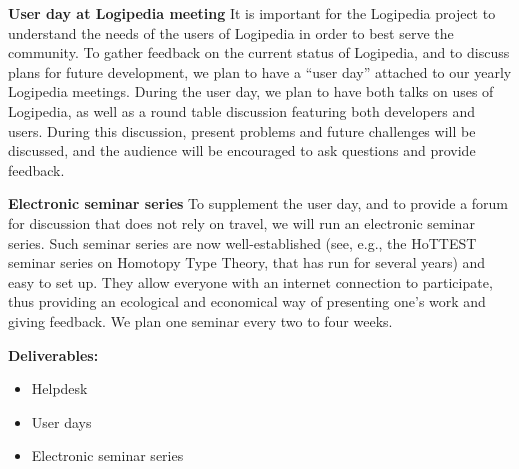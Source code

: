 \begin{workpackage}[id=dissemination,wphases=0-48,type=MGT,
  short=Dissemination,%
  title={Dissemination, communication and exploitation},
  lead=Inr]
\begin{tasklist}
\begin{task}[id=research-club,
      title=Expanding the use of Logipedia in research,
      lead=Bir,BirRM=2]
\begin{compactenum}
     \item [\textbf{User day at Logipedia meeting}]
     It is important for the Logipedia project to understand the needs of the users of Logipedia in order to best serve the community.
     To gather feedback on the current status of Logipedia, and to discuss plans for future development, we plan to have a ``user day'' attached to our yearly Logipedia meetings. 
     During the user day, we plan to have both talks on uses of Logipedia, as well as a round table discussion featuring both developers and users.
     During this discussion, present problems and future challenges will be discussed, and the audience will be encouraged to ask questions and provide feedback.
     \item [\textbf{Electronic seminar series}]
     To supplement the user day, and to provide a forum for discussion that does not rely on travel, we will run an electronic seminar series.
     Such seminar series are now well-established (see, e.g., the HoTTEST seminar series on Homotopy Type Theory, that has run for several years) and easy to set up. They allow everyone with an internet connection to participate, thus providing an ecological and economical way of presenting one's work and giving feedback. We plan one seminar every two to four weeks.
    \end{compactenum}

    \textbf{Deliverables:}
    \begin{itemize}
     \item Helpdesk
     \item User days
     \item Electronic seminar series
    \end{itemize}

    

  \end{task}


\end{tasklist}
\end{workpackage}
